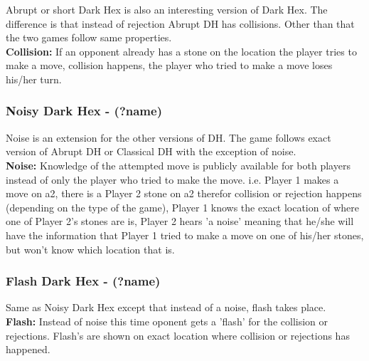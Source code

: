 Abrupt or short Dark Hex is also an interesting version of Dark Hex. The difference is that instead of rejection Abrupt DH has collisions. Other than that the two games follow same properties.\\

{\bf Collision:} If an opponent already has a stone on the location the player tries to make a move, collision happens, the player who tried to make a move loses his/her turn.

\subsubsection{Noisy Dark Hex - (?name)}

Noise is an extension for the other versions of DH. The game follows exact version of Abrupt DH or Classical DH with the exception of noise.\\

{\bf Noise:} Knowledge of the attempted move is publicly available for both players instead of only the player who tried to make the move. i.e. Player 1 makes a move on a2, there is a Player 2 stone on a2 therefor collision or rejection happens (depending on the type of the game), Player 1 knows the exact location of where one of Player 2's stones are is, Player 2 hears 'a noise' meaning that he/she will have the information that Player 1 tried to make a move on one of his/her stones, but won't know which location that is.\\

\subsubsection{Flash Dark Hex - (?name)}

Same as Noisy Dark Hex except that instead of a noise, flash takes place.\\

{\bf Flash:} Instead of noise this time oponent gets a 'flash' for the collision or rejections. Flash's are shown on exact location where collision or rejections has happened.  
